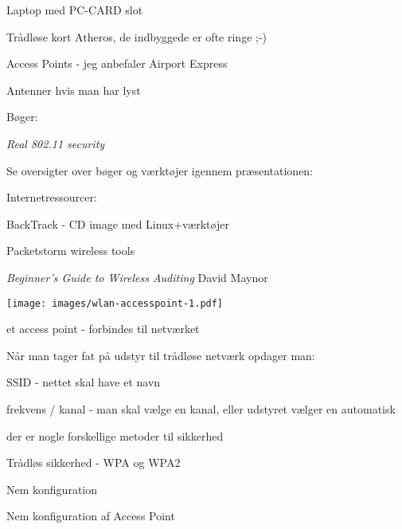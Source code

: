 \begin{list1}
\item Laptop med PC-CARD slot
\item Trådløse kort Atheros, de indbyggede er ofte ringe ;-)
\item Access Points - jeg anbefaler Airport Express
\item Antenner hvis man har lyst
\item Bøger: 
\begin{list2}
\item \emph{Real 802.11 security}
\item Se oversigter over bøger og værktøjer igennem præsentationen:
\end{list2}
\item Internetressourcer:
\begin{list2}
\item BackTrack - CD image med Linux+værktøjer    
\item Packetstorm wireless tools
\item \emph{Beginner's Guide to Wireless Auditing}
David Maynor 
\end{list2}
\end{list1}



\begin{center}
\colorbox{white}{\texttt{[image: images/wlan-accesspoint-1.pdf]}}
\end{center}

\centerline{\hlkbig et access point - forbindes til netværket}


\begin{list1}
\item Når man tager fat på udstyr til trådløse netværk opdager man:
\item SSID - nettet skal have et navn
\item frekvens / kanal - man skal vælge en kanal, eller udstyret
  vælger en automatisk
\item der er nogle forskellige metoder til sikkerhed  
\end{list1}



\begin{list2}
\item Trådløs sikkerhed - WPA og WPA2
\item Nem konfiguration
\item Nem konfiguration af Access Point  
\end{list2}

